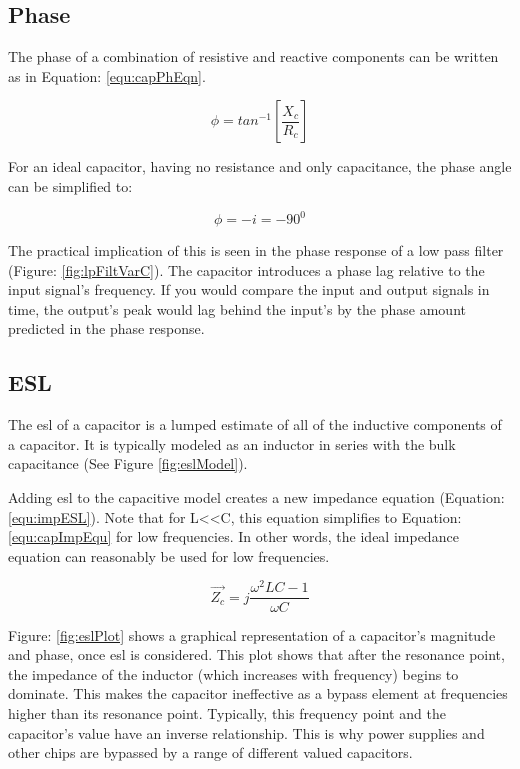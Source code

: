 \subsection{Phase}

The phase of a combination of resistive and reactive components can be written as in Equation: \eqref{equ:capPhEqn}.

\begin{equation}
\label{equ:capPhEqn}
\phi = tan^{-1}[\frac{X_c}{R_c}]
\end{equation}

For an ideal capacitor, having no resistance and only capacitance, the phase angle can be simplified to:

\begin{equation}
\label{equ:capImpEqu2}
\phi = -i = -90^0
\end{equation}

The practical implication of this is seen in the phase response of a low pass filter (Figure: \ref{fig:lpFiltVarC}). The capacitor introduces a phase lag relative to the input signal's frequency. If you would compare the input and output signals in time, the output's peak would lag behind the input's by the phase amount predicted in the phase response.


\subsection{ESL}

The \gls{esl} of a capacitor is a lumped estimate of all of the inductive components of a capacitor. It is typically modeled as an inductor in series with the bulk capacitance (See Figure \ref{fig:eslModel}).



Adding \gls{esl} to the capacitive model creates a new impedance equation (Equation: \eqref{equ:impESL}). Note that for L\textless \textless C, this equation simplifies to Equation: \eqref{equ:capImpEqu} for low frequencies. In other words, the ideal impedance equation can reasonably be used for low frequencies.

\begin{equation}
\label{equ:impESL}
\vec{Z_c} = j\frac{\omega ^2LC - 1}{\omega C}
\end{equation}



Figure: \ref{fig:eslPlot} shows a graphical representation of a capacitor's magnitude and phase, once \gls{esl} is considered. This plot shows that after the resonance point, the impedance of the inductor (which increases with frequency) begins to dominate. This makes the capacitor ineffective as a bypass element at frequencies higher than its resonance point. Typically, this frequency point and the capacitor's value have an inverse relationship. This is why power supplies and other chips are bypassed by a range of different valued capacitors. 

